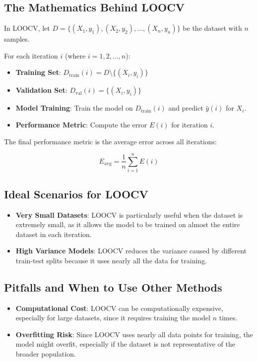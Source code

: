 \documentclass[10pt]{article}
\begin{document}
\subsection{The Mathematics Behind LOOCV}
In LOOCV, let \(D = \{(X_1, y_1), (X_2, y_2), \dots, (X_n, y_n)\}\) be the dataset with \(n\) samples.

For each iteration \(i\) (where \(i = 1, 2, \dots, n\)):

\begin{itemize}
    \item \textbf{Training Set}: \(D_{\text{train}}(i) = D \setminus \{(X_i, y_i)\}\)
    \item \textbf{Validation Set}: \(D_{\text{val}}(i) = \{(X_i, y_i)\}\)
    \item \textbf{Model Training}: Train the model on \(D_{\text{train}}(i)\) and predict \(\hat{y}(i)\) for \(X_i\).
    \item \textbf{Performance Metric}: Compute the error \(E(i)\) for iteration \(i\).
\end{itemize}

The final performance metric is the average error across all iterations:

\[
E_{\text{avg}} = \frac{1}{n} \sum_{i=1}^{n} E(i)
\]

\subsection{Ideal Scenarios for LOOCV}
\begin{itemize}
    \item \textbf{Very Small Datasets}: LOOCV is particularly useful when the dataset is extremely small, as it allows the model to be trained on almost the entire dataset in each iteration.
    \item \textbf{High Variance Models}: LOOCV reduces the variance caused by different train-test splits because it uses nearly all the data for training.
\end{itemize}

\subsection{Pitfalls and When to Use Other Methods}
\begin{itemize}
    \item \textbf{Computational Cost}: LOOCV can be computationally expensive, especially for large datasets, since it requires training the model \(n\) times.
    \item \textbf{Overfitting Risk}: Since LOOCV uses nearly all data points for training, the model might overfit, especially if the dataset is not representative of the broader population.
\end{itemize}
\end{document}
